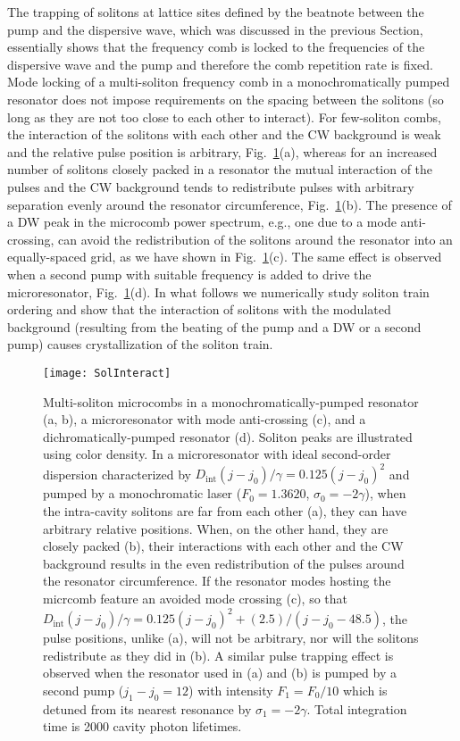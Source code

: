 The trapping of solitons at lattice sites defined by the beatnote between the pump and the dispersive wave, which was discussed in the previous Section, essentially shows that the frequency comb is locked to the frequencies of the dispersive wave and the pump and therefore the comb repetition rate is fixed. Mode locking of a multi-soliton frequency comb in a monochromatically pumped resonator does not impose requirements on the spacing between the solitons (so long as they are not too close to each other to interact). For few-soliton combs, the interaction of the solitons with each other and the CW background is weak and the relative pulse position is arbitrary, Fig.~\ref{fig:Solint}(a), whereas for an increased number of solitons closely packed in a resonator the mutual interaction of the pulses and the CW background tends to redistribute pulses with arbitrary separation evenly around the resonator circumference, Fig.~\ref{fig:Solint}(b). The presence of a DW peak in the microcomb power spectrum, e.g., one due to a mode anti-crossing, can avoid the redistribution of the solitons around the resonator into an equally-spaced grid, as we have shown in Fig.~\ref{fig:Solint}(c). The same effect is observed when a second pump with suitable frequency is added to drive the microresonator, Fig.~\ref{fig:Solint}(d). In what follows we numerically study soliton train ordering and show that the interaction of solitons with the modulated background (resulting from the beating of the pump and a DW or a second pump) causes crystallization of the soliton train.
%
\begin{figure}[tbp]
  \centering
  \texttt{[image: SolInteract]}
\caption{ \small Multi-soliton microcombs in a monochromatically-pumped resonator (a, b), a microresonator with mode anti-crossing (c), and a dichromatically-pumped resonator (d). Soliton peaks are illustrated using color density. In a microresonator with ideal second-order dispersion characterized by $D_\mathrm{int}(j-j_0)/\gamma=0.125(j - j_0)^2$ and pumped by a monochromatic laser ($F_0 = 1.3620$, $\sigma_0 = - 2\gamma$), when the intra-cavity solitons are far from each other (a), they can have arbitrary relative positions. When, on the other hand, they are closely packed (b), their interactions with each other and the CW background results in the even redistribution of the pulses around the resonator circumference. If the resonator modes hosting the micrcomb feature an avoided mode crossing (c), so that $D_\mathrm{int}(j-j_0)/\gamma=0.125(j - j_0)^2 + (2.5)/(j - j_0 - 48.5)$, the pulse positions, unlike (a), will not be arbitrary, nor will the solitons redistribute as they did in (b). A similar pulse trapping effect is observed when the resonator used in (a) and (b) is pumped by a second pump ($j_1 - j_0 = 12$) with intensity $F_1 = F_0 / 10$ which is detuned from its nearest resonance by $\sigma_1 = -2\gamma$. Total integration time is 2000 cavity photon lifetimes.
} \label{fig:Solint}
\end{figure}
%

